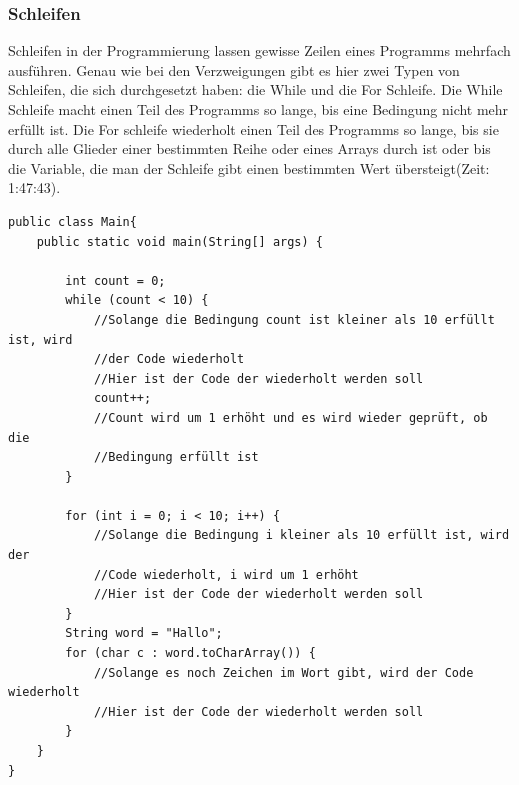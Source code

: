 \subsubsection{Schleifen}
Schleifen in der Programmierung lassen gewisse Zeilen eines Programms mehrfach ausführen. Genau wie bei den Verzweigungen gibt es hier zwei Typen von Schleifen, die sich durchgesetzt haben: die While und die For Schleife. Die While Schleife macht einen Teil des Programms so lange, bis eine Bedingung nicht mehr erfüllt ist. Die For schleife wiederholt einen Teil des Programms so lange, bis sie durch alle Glieder einer bestimmten Reihe oder eines Arrays durch ist oder bis die Variable, die man der Schleife gibt einen bestimmten Wert übersteigt\cite{freecodecamporg_android_2020}(Zeit: 1:47:43). \clearpage
\begin{verbatim}
public class Main{
    public static void main(String[] args) {
        
        int count = 0;
        while (count < 10) {
            //Solange die Bedingung count ist kleiner als 10 erfüllt ist, wird
            //der Code wiederholt
            //Hier ist der Code der wiederholt werden soll
            count++;
            //Count wird um 1 erhöht und es wird wieder geprüft, ob die 
            //Bedingung erfüllt ist
        }
        
        for (int i = 0; i < 10; i++) {
            //Solange die Bedingung i kleiner als 10 erfüllt ist, wird der 
            //Code wiederholt, i wird um 1 erhöht
            //Hier ist der Code der wiederholt werden soll
        }
        String word = "Hallo";
        for (char c : word.toCharArray()) {
            //Solange es noch Zeichen im Wort gibt, wird der Code wiederholt
            //Hier ist der Code der wiederholt werden soll
        }
    }
}
\end{verbatim}

